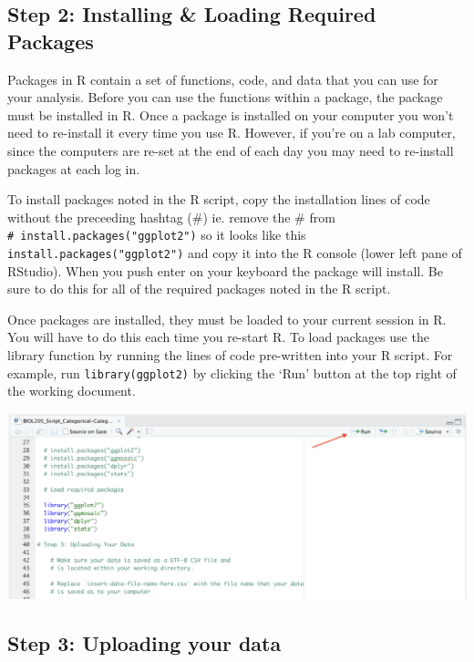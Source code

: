 \documentclass[
]{book}
\begin{document}
\hypertarget{step-2-installing-loading-required-packages}{%
\subsection*{Step 2: Installing \& Loading Required Packages}\label{step-2-installing-loading-required-packages}}

Packages in R contain a set of functions, code, and data that you can use for your analysis. Before you can use the functions within a package, the package must be installed in R. Once a package is installed on your computer you won't need to re-install it every time you use R. However, if you're on a lab computer, since the computers are re-set at the end of each day you may need to re-install packages at each log in.

To install packages noted in the R script, copy the installation lines of code without the preceeding hashtag (\#) ie. remove the \# from \texttt{\#\ install.packages("ggplot2")} so it looks like this \texttt{install.packages("ggplot2")} and copy it into the R console (lower left pane of RStudio). When you push enter on your keyboard the package will install. Be sure to do this for all of the required packages noted in the R script.

Once packages are installed, they must be loaded to your current session in R. You will have to do this each time you re-start R. To load packages use the library function by running the lines of code pre-written into your R script. For example, run \texttt{library(ggplot2)} by clicking the `Run' button at the top right of the working document.

\includegraphics{images/run_button.png}

\hypertarget{step-3-uploading-your-data}{%
\subsection*{Step 3: Uploading your data}\label{step-3-uploading-your-data}}
\end{document}
